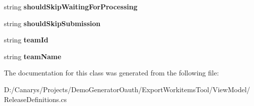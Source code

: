 \begin{DoxyCompactItemize}
\item 
\mbox{\label{class_templates_generator_tool_1_1_view_model_1_1_release_definitions_1_1_inputs_ae8224128b492196e31dc9d0b840f08af}} 
string {\bfseries should\+Skip\+Waiting\+For\+Processing}
\item 
\mbox{\label{class_templates_generator_tool_1_1_view_model_1_1_release_definitions_1_1_inputs_ac9ce99fcbce438487b5ceda38ed0f955}} 
string {\bfseries should\+Skip\+Submission}
\item 
\mbox{\label{class_templates_generator_tool_1_1_view_model_1_1_release_definitions_1_1_inputs_a2b118218ffa61637f18c297cd38a256e}} 
string {\bfseries team\+Id}
\item 
\mbox{\label{class_templates_generator_tool_1_1_view_model_1_1_release_definitions_1_1_inputs_a6d83ad6afebcc9cc6df3cd514afcc7df}} 
string {\bfseries team\+Name}
\end{DoxyCompactItemize}


The documentation for this class was generated from the following file\+:\begin{DoxyCompactItemize}
\item 
D\+:/\+Canarys/\+Projects/\+Demo\+Generator\+Oauth/\+Export\+Workitems\+Tool/\+View\+Model/Release\+Definitions.\+cs\end{DoxyCompactItemize}
